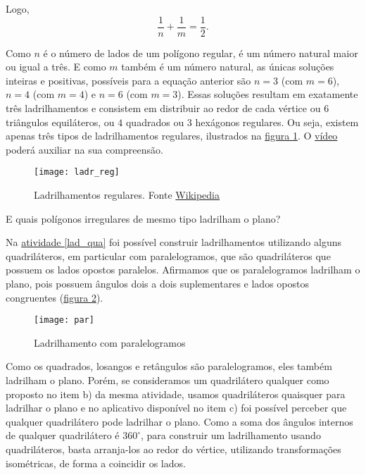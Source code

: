 Logo,
\begin{equation*}
\frac{1}{n}+\frac{1}{m}=\frac{1}{2}.
\end{equation*}

Como $n$ é o número de lados de um polígono regular, é um número natural maior ou igual a três. E como $m$ também é um número natural, as únicas soluções inteiras e positivas, possíveis para a equação anterior são $n=3$ (com $m=6$), $n=4$ (com $m=4$) e $n=6$ (com $m=3$). Essas soluções resultam em exatamente três ladrilhamentos e consistem em distribuir ao redor de cada vértice ou $6$ triângulos equiláteros, ou $4$ quadrados ou $3$ hexágonos regulares. Ou seja, existem apenas três tipos de ladrilhamentos regulares, ilustrados na \hyperref[ladr_reg]{figura \ref{ladr_reg}}. O   \href{https://youtu.be/y__0a7TDbfs}{vídeo} poderá auxiliar na sua compreensão.


\begin{figure}[H]
\centering
\texttt{[image: ladr\_reg]}
\caption{Ladrilhamentos regulares. Fonte \href{https://en.wikipedia.org/wiki/Euclidean_tilings_by_convex_regular_polygons}{Wikipedia}}
\label{ladr_reg}
\end{figure}



E quais polígonos irregulares de mesmo tipo ladrilham o plano?
 
Na \hyperref[lad_qua]{atividade \ref{lad_qua}} foi possível construir ladrilhamentos utilizando alguns quadriláteros, em particular com paralelogramos, que são quadriláteros que possuem os lados opostos paralelos. Afirmamos que os paralelogramos ladrilham o plano, pois possuem ângulos dois a dois suplementares e lados opostos congruentes (\hyperref[par]{figura \ref{par}}).

\begin{figure}[H]
\centering
\texttt{[image: par]}
\caption{Ladrilhamento com paralelogramos}
\label{par}
\end{figure}


Como os quadrados, losangos e retângulos são paralelogramos, eles também ladrilham o plano.
Porém, se consideramos um quadrilátero qualquer como proposto no item b) da mesma atividade, usamos quadriláteros quaisquer para ladrilhar o plano e no aplicativo disponível no item c) foi possível perceber que qualquer quadrilátero pode ladrilhar o plano. Como a  soma dos ângulos internos de qualquer quadrilátero é $360^{\circ}$, para construir um ladrilhamento usando quadriláteros, basta arranja-los ao redor do vértice, utilizando transformações isométricas, de forma a coincidir os lados. 

